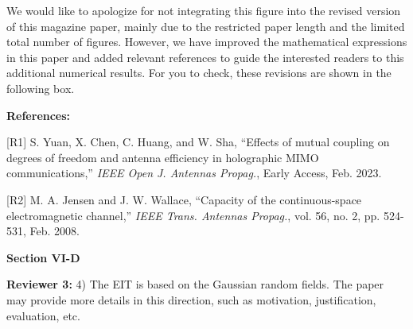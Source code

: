 \documentclass[a4paper,12pt]{article}
\newcommand{\red}[1]{{\color{red}{#1}}}
\begin{document}
{    \quad We would like to apologize for not integrating this figure into the revised version of this magazine paper, mainly due to the restricted paper length and the limited total number of figures. However, we have improved the mathematical expressions in this paper and added relevant references to guide the interested readers to this additional numerical results. For you to check, these revisions are shown in the following box. 

    {\bf References: }

    [R1] S. Yuan, X. Chen, C. Huang, and W. Sha, ``Effects of mutual coupling on degrees of freedom and antenna efficiency in holographic MIMO communications,'' {\it IEEE Open J. Antennas Propag.}, Early Access, Feb. 2023. 

    [R2] M. A. Jensen and J. W. Wallace, ``Capacity of the continuous-space electromagnetic channel,'' {\it IEEE Trans. Antennas Propag.}, vol. 56, no. 2, pp. 524-531, Feb. 2008. 
}

\begin{framed}
    {\bf Section VI-D}

    \red{
        In classical information theory, the ``capacity'' is defined as the supremum of all the operationally achievable transmission rates. It is favorable that in discrete memoryless systems, the capacity equals the maximum mutual information, but this conclusion is generally not true for all kinds of channels. In the existing works on EIT~[7, 8, 14], maximum EIT mutual information values are calculated under the assumptions of linear deterministic EM channels and continuous transceivers, and the EIT mutual information is further compared to the discrete MIMO mutual information. Unfortunately, these EIT mutual information values only serve as an upper bound to the EM operational capacity. 
        Thus, in the strict sense, the EM capacity is still an open problem. 
    }
\end{framed}

\textbf{Reviewer 3:}
4) The EIT is based on the Gaussian random fields. The paper may provide more details in this direction, such as motivation, justification, evaluation, etc.
\end{document}
